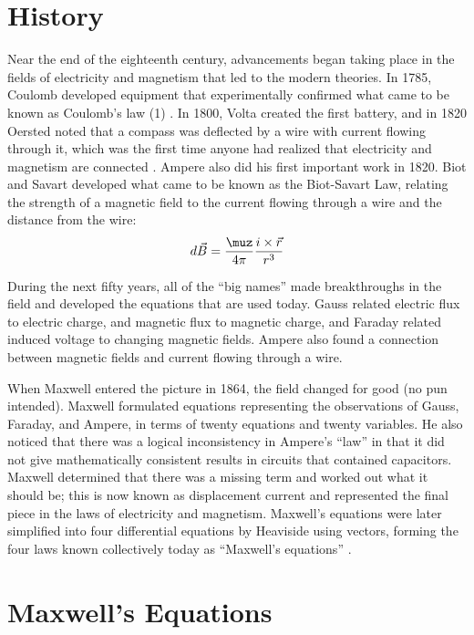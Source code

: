 \documentclass[12pt]{article}
\begin{document}
\section{History}

\indent Near the end of the eighteenth century, advancements began taking place in the fields of electricity and magnetism that led to the modern theories. In 1785, Coulomb developed equipment that experimentally confirmed what came to be known as Coulomb's law (1) \cite{Biggus}. In 1800, Volta created the first battery, and in 1820 Oersted noted that a compass was deflected by a wire with current flowing through it, which was the first time anyone had realized that electricity and magnetism are connected \cite{Biggus}. Ampere also did his first important work in 1820. Biot and Savart developed what came to be known as the Biot-Savart Law, relating the strength of a magnetic field to the current flowing through a wire and the distance from the wire:
\begin{equation}
d\vec{B}=\frac{\muz}{4\pi}\frac{i\times\vec{r}}{r^3}
\end{equation}

During the next fifty years, all of the ``big names'' made breakthroughs in the field and developed the equations that are used today. Gauss related electric flux to electric charge, and magnetic flux to magnetic charge, and Faraday related induced voltage to changing magnetic fields. Ampere also found a connection between magnetic fields and current flowing through a wire.

When Maxwell entered the picture in 1864, the field changed for good (no pun intended). Maxwell formulated equations representing the observations of Gauss, Faraday, and Ampere, in terms of twenty equations and twenty variables. He also noticed that there was a logical inconsistency in Ampere's ``law'' in that it did not give mathematically consistent results in circuits that contained capacitors. Maxwell determined that there was a missing term and worked out what it should be; this is now known as displacement current and represented the final piece in the laws of electricity and magnetism. Maxwell's equations were later simplified into four differential equations by Heaviside using vectors, forming the four laws known collectively today as ``Maxwell's equations'' \cite{Wikipedia}.

\section{Maxwell's Equations}
\end{document}
